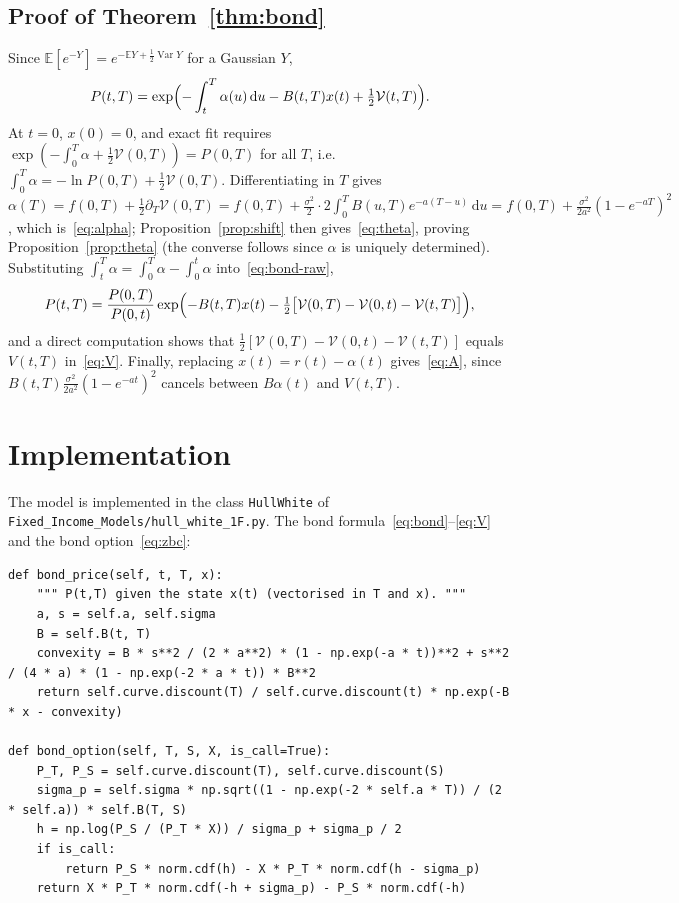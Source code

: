 \documentclass[11pt,a4paper]{article}
\theoremstyle{plain}
\theoremstyle{definition}
\newcommand{\dd}{\mathrm{d}}
\newcommand{\E}{\mathbb{E}}
\DeclareMathOperator{\Var}{Var}
\begin{document}
\subsection{Proof of Theorem~\ref{thm:bond}}
Since $\E[e^{-Y}]=e^{-\E Y+\frac12\Var Y}$ for a Gaussian $Y$,
\begin{equation}
    P(t,T)=\exp\Bigl(-\int_t^T\alpha(u)\,\dd u-B(t,T)x(t)+\tfrac12\mathcal{V}(t,T)\Bigr).
    \label{eq:bond-raw}
\end{equation}
At $t=0$, $x(0)=0$, and exact fit requires $\exp(-\int_0^T\alpha+\frac12\mathcal{V}(0,T))=P(0,T)$ for all $T$, i.e.\ $\int_0^T\alpha=-\ln P(0,T)+\frac12\mathcal{V}(0,T)$. Differentiating in $T$ gives $\alpha(T)=f(0,T)+\frac12\partial_T\mathcal{V}(0,T)=f(0,T)+\frac{\sigma^2}{2}\cdot2\int_0^TB(u,T)e^{-a(T-u)}\,\dd u=f(0,T)+\frac{\sigma^2}{2a^2}(1-e^{-aT})^2$, which is~\eqref{eq:alpha}; Proposition~\ref{prop:shift} then gives~\eqref{eq:theta}, proving Proposition~\ref{prop:theta} (the converse follows since $\alpha$ is uniquely determined). Substituting $\int_t^T\alpha=\int_0^T\alpha-\int_0^t\alpha$ into~\eqref{eq:bond-raw},
\begin{equation}
    P(t,T)=\frac{P(0,T)}{P(0,t)}\exp\Bigl(-B(t,T)x(t)-\tfrac12\bigl[\mathcal{V}(0,T)-\mathcal{V}(0,t)-\mathcal{V}(t,T)\bigr]\Bigr),
\end{equation}
and a direct computation shows that $\frac12[\mathcal{V}(0,T)-\mathcal{V}(0,t)-\mathcal{V}(t,T)]$ equals $V(t,T)$ in~\eqref{eq:V}. Finally, replacing $x(t)=r(t)-\alpha(t)$ gives~\eqref{eq:A}, since $B(t,T)\frac{\sigma^2}{2a^2}(1-e^{-at})^2$ cancels between $B\alpha(t)$ and $V(t,T)$.

\clearpage
\section{Implementation}
\label{app:code}

The model is implemented in the class \texttt{HullWhite} of \texttt{Fixed\_Income\_Models/hull\_white\_1F.py}. The bond formula~\eqref{eq:bond}--\eqref{eq:V} and the bond option~\eqref{eq:zbc}:
\begin{lstlisting}[style=pystyle]
def bond_price(self, t, T, x):
    """ P(t,T) given the state x(t) (vectorised in T and x). """
    a, s = self.a, self.sigma
    B = self.B(t, T)
    convexity = B * s**2 / (2 * a**2) * (1 - np.exp(-a * t))**2 + s**2 / (4 * a) * (1 - np.exp(-2 * a * t)) * B**2
    return self.curve.discount(T) / self.curve.discount(t) * np.exp(-B * x - convexity)

def bond_option(self, T, S, X, is_call=True):
    P_T, P_S = self.curve.discount(T), self.curve.discount(S)
    sigma_p = self.sigma * np.sqrt((1 - np.exp(-2 * self.a * T)) / (2 * self.a)) * self.B(T, S)
    h = np.log(P_S / (P_T * X)) / sigma_p + sigma_p / 2
    if is_call:
        return P_S * norm.cdf(h) - X * P_T * norm.cdf(h - sigma_p)
    return X * P_T * norm.cdf(-h + sigma_p) - P_S * norm.cdf(-h)
\end{lstlisting}
\end{document}

